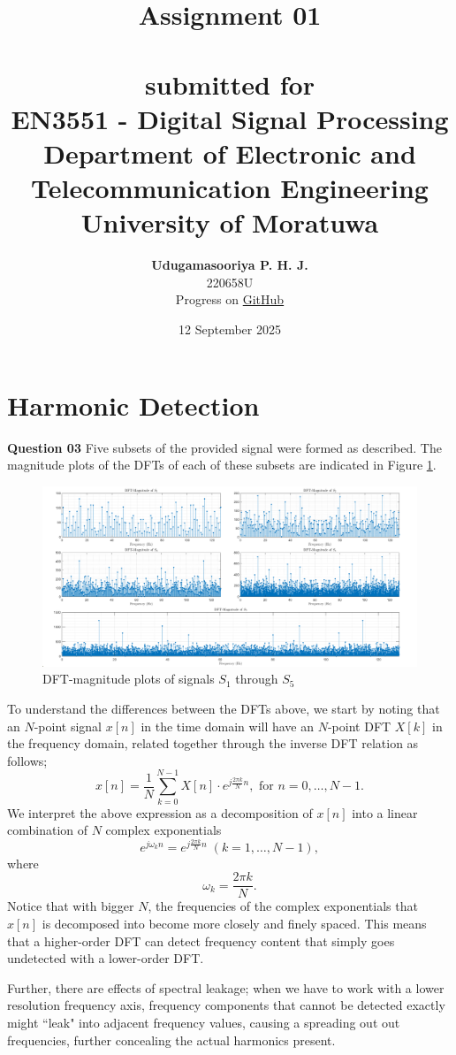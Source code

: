 \documentclass{article}[a4paper]
\title{
	\huge{\textbf{
		Assignment 01
	}}\\
	\large{\phantom{}}\\
	\large{
		submitted for
	}\\
	\Large{
		\textbf{EN3551 - Digital Signal Processing}
	}\\
	\large{
		Department of Electronic and Telecommunication Engineering
	}
	\\
	\large{University of Moratuwa}
}
\author{
	\textbf{Udugamasooriya P. H. J.}\\
	220658U\\
	\small{Progress on \href{https://github.com/pulasthi-u/en3150-assignment01}{GitHub \extlink}}
}
\date{12 September 2025}
\begin{document}
	\maketitle
	
	\section{Harmonic Detection}
	
	\textbf{Question 03} Five subsets of the provided signal were formed as described. The magnitude plots of the DFTs of each of these subsets are indicated in Figure \ref{subset_dfts}.
	
	\begin{figure}[H]
		\centering
		\includegraphics[width=\linewidth]{images/q1_3_1.png}
		\caption{DFT-magnitude plots of signals $S_1$ through $S_5$}
		\label{subset_dfts}
	\end{figure}
	
	To understand the differences between the DFTs above, we start by noting that an $N$-point signal $x[n]$ in the time domain will have an $N$-point DFT $X[k]$ in the frequency domain, related together through the inverse DFT relation as follows; \[
		x[n] = \dfrac{1}{N} \sum_{k=0}^{N-1} X[n] \cdot e^{j\frac{2\pi k}{N}n}, \text{ for } n = 0, \dots, N-1.
	\] We interpret the above expression as a decomposition of $x[n]$ into a linear combination of $N$ complex exponentials \[
		e^{j \omega_k n} = e^{j\frac{2\pi k}{N}n} \; (k = 1, \dots, N-1),
	\] where \[
		\omega_k = \frac{2\pi k}{N}.
	\] Notice that with bigger $N$, the frequencies of the complex exponentials that $x[n]$ is decomposed into become more closely and finely spaced. This means that a higher-order DFT can detect frequency content that simply goes undetected with a lower-order DFT.
	
	Further, there are effects of spectral leakage; when we have to work with a lower resolution frequency axis, frequency components that cannot be detected exactly might ``leak" into adjacent frequency values, causing a spreading out out frequencies, further concealing the actual harmonics present.
	
\end{document}
